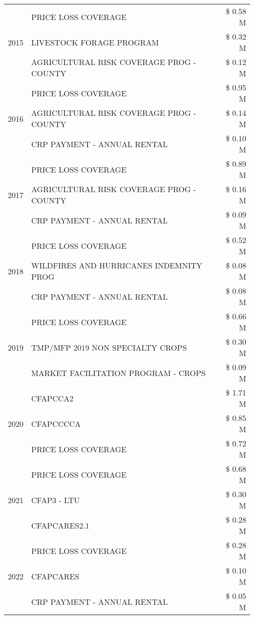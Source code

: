 \begin{tabular}{llr}
\cline{1-3}
\multirow[t]{3}{*}{2015} & PRICE LOSS COVERAGE & \$ 0.58 M \\
 & LIVESTOCK FORAGE PROGRAM & \$ 0.32 M \\
 & AGRICULTURAL RISK COVERAGE PROG - COUNTY & \$ 0.12 M \\
\cline{1-3}
\multirow[t]{3}{*}{2016} & PRICE LOSS COVERAGE & \$ 0.95 M \\
 & AGRICULTURAL RISK COVERAGE PROG - COUNTY & \$ 0.14 M \\
 & CRP PAYMENT - ANNUAL RENTAL & \$ 0.10 M \\
\cline{1-3}
\multirow[t]{3}{*}{2017} & PRICE LOSS COVERAGE & \$ 0.89 M \\
 & AGRICULTURAL RISK COVERAGE PROG - COUNTY & \$ 0.16 M \\
 & CRP PAYMENT - ANNUAL RENTAL & \$ 0.09 M \\
\cline{1-3}
\multirow[t]{3}{*}{2018} & PRICE LOSS COVERAGE & \$ 0.52 M \\
 & WILDFIRES AND HURRICANES INDEMNITY PROG & \$ 0.08 M \\
 & CRP PAYMENT - ANNUAL RENTAL & \$ 0.08 M \\
\cline{1-3}
\multirow[t]{3}{*}{2019} & PRICE LOSS COVERAGE & \$ 0.66 M \\
 & TMP/MFP 2019 NON SPECIALTY CROPS & \$ 0.30 M \\
 & MARKET FACILITATION PROGRAM - CROPS & \$ 0.09 M \\
\cline{1-3}
\multirow[t]{3}{*}{2020} & CFAPCCA2 & \$ 1.71 M \\
 & CFAPCCCCA & \$ 0.85 M \\
 & PRICE LOSS COVERAGE & \$ 0.72 M \\
\cline{1-3}
\multirow[t]{3}{*}{2021} & PRICE LOSS COVERAGE & \$ 0.68 M \\
 & CFAP3 - LTU & \$ 0.30 M \\
 & CFAPCARES2.1 & \$ 0.28 M \\
\cline{1-3}
\multirow[t]{3}{*}{2022} & PRICE LOSS COVERAGE & \$ 0.28 M \\
 & CFAPCARES & \$ 0.10 M \\
 & CRP PAYMENT - ANNUAL RENTAL & \$ 0.05 M \\
\cline{1-3}
\bottomrule
\end{tabular}
